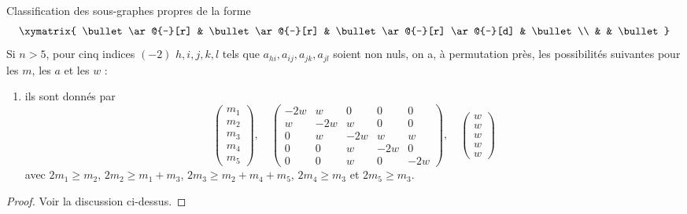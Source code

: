 \begin{lemma}
\label{lemma-D5}
Classification des sous-graphes propres de la forme
$$
\xymatrix{
\bullet \ar@{-}[r] & \bullet \ar@{-}[r] &
\bullet \ar@{-}[r] \ar@{-}[d] & \bullet \\
& & \bullet
}
$$
Si $n > 5$, pour cinq indices $(-2)$ $h, i, j, k, l$
tels que $a_{hi}, a_{ij}, a_{jk}, a_{jl}$ soient non nuls, on a,
à permutation près, les possibilités suivantes pour les $m$, les $a$ et les $w$ :
\begin{enumerate}
\item
\label{item-D5}
ils sont donnés par
$$
\left(
\begin{matrix}
m_1 \\
m_2 \\
m_3 \\
m_4 \\
m_5
\end{matrix}
\right),
\quad
\left(
\begin{matrix}
-2w & w & 0 & 0 & 0 \\
w & -2w & w & 0 & 0 \\
0 & w & -2w & w & w \\
0 & 0 & w & -2w & 0 \\
0 & 0 & w & 0 & -2w
\end{matrix}
\right),
\quad
\left(
\begin{matrix}
w \\
w \\
w \\
w \\
w
\end{matrix}
\right)
$$
avec $2m_1 \geq m_2$, $2m_2 \geq m_1 + m_3$, $2m_3 \geq m_2 + m_4 + m_5$,
$2m_4 \geq m_3$ et $2m_5 \geq m_3$.
\end{enumerate}
\end{lemma}

\begin{proof}
Voir la discussion ci-dessus.
\end{proof}

